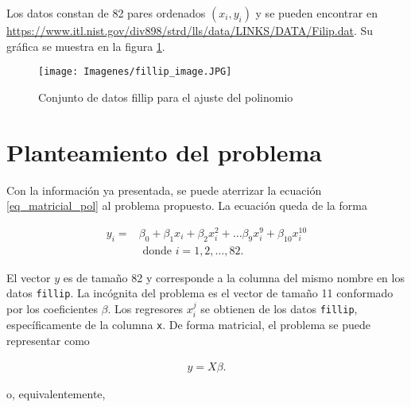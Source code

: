 Los datos constan de 82 pares ordenados $(x_i, y_i)$ y se pueden encontrar en \url{https://www.itl.nist.gov/div898/strd/lls/data/LINKS/DATA/Filip.dat}. Su gráfica se muestra en la figura \ref{fillip_graph}. 

\begin{figure}[h]
	\begin{center}
		\texttt{[image: Imagenes/fillip\_image.JPG]}
		\caption{Conjunto de datos fillip para el ajuste del polinomio}
		\label{fillip_graph}
	\end{center}
\end{figure}

\section{Planteamiento del problema}
Con la información ya presentada, se puede aterrizar la ecuación \ref{eq_matricial_pol} al problema propuesto. La ecuación queda de la forma 

\begin{align*}
		y_i = & \beta_0 + \beta_1 x_i + \beta_2 x_i^{2} + \dots \beta_{9} x_{i}^{9} + \beta_{10} x_{i}^{10} \\ 
		& \text{ donde } i = 1, 2, \dots , 82.
\end{align*}

El vector $y$ es de tamaño 82 y corresponde a la columna del mismo nombre en los datos \texttt{fillip}. La incógnita del problema es el vector de tamaño 11 conformado por los coeficientes $\beta$. Los regresores $x_i^{j}$ se obtienen de los datos \texttt{fillip}, específicamente de la columna \texttt{x}. De forma matricial, el problema se puede representar como 
  
\begin{equation} \label{eq_matricial}
	\begin{aligned}
		y = X \beta.
	\end{aligned}
\end{equation}

\noindent o, equivalentemente,

